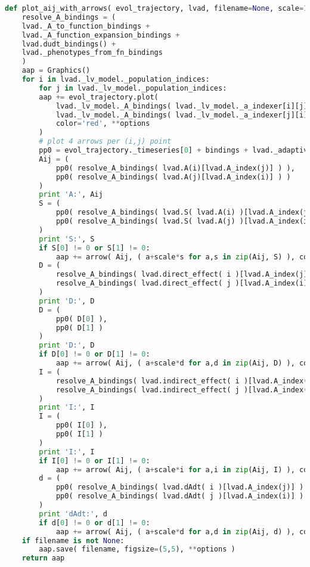 \begin{lstlisting}[language=Python]
def plot_aij_with_arrows( evol_trajectory, lvad, filename=None, scale=1, bindings=Bindings(), **options ):
    resolve_A_bindings = (
	lvad._A_to_function_bindings +
	lvad._A_function_expansion_bindings +
	lvad.dudt_bindings() +
	lvad._phenotypes_from_fn_bindings
    )
    aap = Graphics()
    for i in lvad._lv_model._population_indices:
        for j in lvad._lv_model._population_indices:
	    aap += evol_trajectory.plot(
	        lvad._lv_model._A_bindings( lvad._lv_model._a_indexer[i][j] ),
	        lvad._lv_model._A_bindings( lvad._lv_model._a_indexer[j][i] ),
	        color='red', **options
	    )
	    # plot 4 arrows per (i,j) point
	    pp0 = evol_trajectory._timeseries[0] + bindings + lvad._adaptivedynamics._bindings
	    Aij = (
	        pp0( resolve_A_bindings( lvad.A(i)[lvad.A_index(j)] ) ),
	        pp0( resolve_A_bindings( lvad.A(j)[lvad.A_index(i)] ) )
	    )
	    print 'A:', Aij
	    S = (
	        pp0( resolve_A_bindings( lvad.S( lvad.A(i) )[lvad.A_index(j)] ) ),
	        pp0( resolve_A_bindings( lvad.S( lvad.A(j) )[lvad.A_index(i)] ) )
	    )
	    print 'S:', S
	    if S[0] != 0 or S[1] != 0:
	        aap += arrow( Aij, ( a+scale*s for a,s in zip(Aij, S) ), color='red' )
	    D = (
	        resolve_A_bindings( lvad.direct_effect( i )[lvad.A_index(j)] ),
	        resolve_A_bindings( lvad.direct_effect( j )[lvad.A_index(i)] )
	    )
	    print 'D:', D
	    D = (
	        pp0( D[0] ),
	        pp0( D[1] )
	    )
	    print 'D:', D
	    if D[0] != 0 or D[1] != 0:
	        aap += arrow( Aij, ( a+scale*d for a,d in zip(Aij, D) ), color='green' )
	    I = (
	        resolve_A_bindings( lvad.indirect_effect( i )[lvad.A_index(j)] ),
	        resolve_A_bindings( lvad.indirect_effect( j )[lvad.A_index(i)] )
	    )
	    print 'I:', I
	    I = (
	        pp0( I[0] ),
	        pp0( I[1] )
	    )
	    print 'I:', I
	    if I[0] != 0 or I[1] != 0:
	        aap += arrow( Aij, ( a+scale*i for a,i in zip(Aij, I) ), color='purple' )
	    d = (
	        pp0( resolve_A_bindings( lvad.dAdt( i )[lvad.A_index(j)] ) ),
	        pp0( resolve_A_bindings( lvad.dAdt( j )[lvad.A_index(i)] ) )
	    )
	    print 'dAdt:', d
	    if d[0] != 0 or d[1] != 0:
	        aap += arrow( Aij, ( a+scale*d for a,d in zip(Aij, d) ), color='blue' )
    if filename is not None:
        aap.save( filename, figsize=(5,5), **options )
    return aap
\end{lstlisting}
